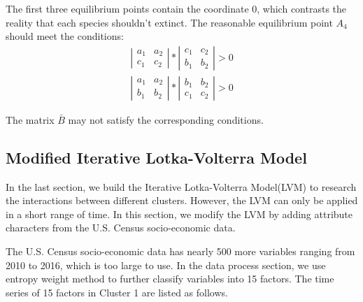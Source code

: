 \documentclass[11pt]{article}
\begin{document}
The first three equilibrium points contain the coordinate 0, which contrasts the reality that each species shouldn't extinct. The reasonable equilibrium point $A_{4}$ should meet the conditions:
\begin{gather*}
	\left \vert 
	\begin{matrix}
		a_{1} & a_{2} \\
		c_{1} & c_{2} 
	\end{matrix}
	\right \vert
	\ast
	\left \vert
	\begin{matrix}
		c_{1} & c_{2} \\
		b_{1} & b_{2}
	\end{matrix}
	\right \vert
	> 0 \\
	\left \vert 
	\begin{matrix}
		a_{1} & a_{2} \\
		b_{1} & b_{2} 
	\end{matrix}
	\right \vert
	\ast
	\left \vert
	\begin{matrix}
		b_{1} & b_{2} \\
		c_{1} & c_{2}
	\end{matrix}
	\right \vert
	> 0
\end{gather*}

The matrix $\bar B$ may not satisfy the corresponding conditions.

\subsection{Modified Iterative Lotka-Volterra Model}
In the last section, we build the Iterative Lotka-Volterra Model(LVM) to research the interactions between different clusters. However, the LVM can only be applied in a short range of time. In this section, we modify the LVM by adding attribute characters from the U.S. Census socio-economic data.

The U.S. Census socio-economic data has nearly 500 more variables ranging from 2010 to 2016, which is too large to use. In the data process section, we use entropy weight method to further classify variables into 15 factors. The time series of 15 factors in Cluster 1 are listed as follows.
\end{document}
